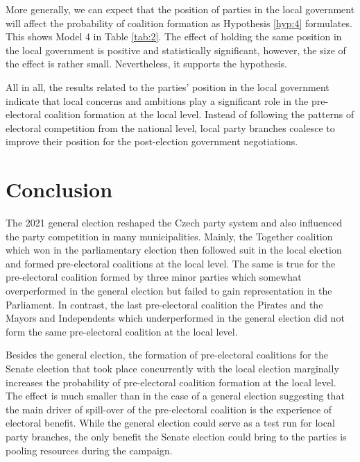 \documentclass[]{interact}
\theoremstyle{plain}%
\theoremstyle{definition}
\theoremstyle{remark}
\begin{document}
More generally, we can expect that the position of parties in the local government will affect the probability of coalition formation as Hypothesis \ref{hyp:4} formulates. This shows Model 4 in Table \ref{tab:2}. The effect of holding the same position in the local government is positive and statistically significant, however, the size of the effect is rather small. Nevertheless, it supports the hypothesis.



All in all, the results related to the parties' position in the local government indicate that local concerns and ambitions play a significant role in the pre-electoral coalition formation at the local level. Instead of following the patterns of electoral competition from the national level, local party branches coalesce to improve their position for the post-election government negotiations.


\section{Conclusion}

The 2021 general election reshaped the Czech party system and also influenced the party competition in many municipalities. Mainly, the Together coalition which won in the parliamentary election then followed suit in the local election and formed pre-electoral coalitions at the local level. The same is true for the pre-electoral coalition formed by three minor parties which somewhat overperformed in the general election but failed to gain representation in the Parliament. In contrast, the last pre-electoral coalition the Pirates and the Mayors and Independents which underperformed in the general election did not form the same pre-electoral coalition at the local level.

Besides the general election, the formation of pre-electoral coalitions for the Senate election that took place concurrently with the local election marginally increases the probability of pre-electoral coalition formation at the local level. The effect is much smaller than in the case of a general election suggesting that the main driver of spill-over of the pre-electoral coalition is the experience of electoral benefit. While the general election could serve as a test run for local party branches, the only benefit the Senate election could bring to the parties is pooling resources during the campaign.
\end{document}
